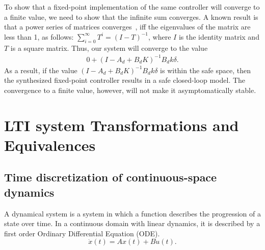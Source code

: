 \documentclass[runningheads,a4paper]{llncs}
\begin{document}
To show that a fixed-point implementation of the same controller will converge to a finite value, 
we need to show that the infinite sum converges.
A known result is that a power series of matrices converges~\cite{horn1990matrix}, iff the eigenvalues of the matrix are less than 1, as follows:
$\sum_{i=0}^{\infty}T^i  = (I - T)^{-1}$, 
where $I$ is the identity matrix and $T$ is a square matrix. Thus, our system will converge to the value 
\begin{align*}
0 + (I - A_d + B_dK)^{-1}B_dk\delta. 
\end{align*}
As a result, if the value $(I - A_d + B_dK)^{-1}B_dk\delta$ is within the safe space, then the synthesized fixed-point controller results in a safe closed-loop model. 
The convergence to a finite value, however, will not make it asymptomatically stable.


\section{LTI system Transformations and Equivalences} \label{sec:appendix:LTIbackground}

\subsection{Time discretization of continuous-space dynamics}

A dynamical system is a system in which a function describes the progression of a state over time. 
In a continuous domain with linear dynamics, it is described by a first order Ordinary Differential Equation (ODE).
\begin{equation}
\dot{x}(t)=Ax(t)+Bu(t).
\label{eq:dynamical}
\end{equation}
\end{document}
